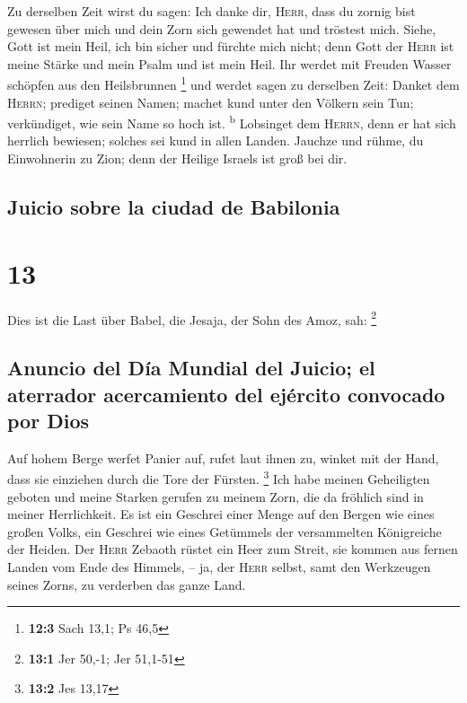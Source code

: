  Zu derselben Zeit wirst du sagen: Ich danke dir,
\textsc{Herr}, dass du zornig bist gewesen über mich und dein Zorn sich
gewendet hat und tröstest mich.  Siehe, Gott ist mein
Heil, ich bin sicher und fürchte mich nicht; denn Gott der \textsc{Herr}
ist meine Stärke und mein Psalm und ist mein Heil.  Ihr
werdet mit Freuden Wasser schöpfen aus den Heilsbrunnen \footnote{\textbf{12:3}
  Sach 13,1; Ps 46,5}  und werdet sagen zu derselben Zeit:
Danket dem \textsc{Herrn}; prediget seinen Namen; machet kund unter den
Völkern sein Tun; verkündiget, wie sein Name so hoch ist.
\textsuperscript{b}  Lobsinget dem \textsc{Herrn}, denn er
hat sich herrlich bewiesen; solches sei kund in allen Landen.
 Jauchze und rühme, du Einwohnerin zu Zion; denn der
Heilige Israels ist groß bei dir.

\hypertarget{juicio-sobre-la-ciudad-de-babilonia}{%
\subsection{Juicio sobre la ciudad de
Babilonia}\label{juicio-sobre-la-ciudad-de-babilonia}}

\hypertarget{section-12}{%
\section{13}\label{section-12}}

 Dies ist die Last über Babel, die Jesaja, der Sohn des
Amoz, sah: \footnote{\textbf{13:1} Jer 50,-1; Jer 51,1-51}

\hypertarget{anuncio-del-duxeda-mundial-del-juicio-el-aterrador-acercamiento-del-ejuxe9rcito-convocado-por-dios}{%
\subsection{Anuncio del Día Mundial del Juicio; el aterrador
acercamiento del ejército convocado por
Dios}\label{anuncio-del-duxeda-mundial-del-juicio-el-aterrador-acercamiento-del-ejuxe9rcito-convocado-por-dios}}

 Auf hohem Berge werfet Panier auf, rufet laut ihnen zu,
winket mit der Hand, dass sie einziehen durch die Tore der Fürsten.
\footnote{\textbf{13:2} Jes 13,17}  Ich habe meinen
Geheiligten geboten und meine Starken gerufen zu meinem Zorn, die da
fröhlich sind in meiner Herrlichkeit.  Es ist ein Geschrei
einer Menge auf den Bergen wie eines großen Volks, ein Geschrei wie
eines Getümmels der versammelten Königreiche der Heiden. Der
\textsc{Herr} Zebaoth rüstet ein Heer zum Streit,  sie
kommen aus fernen Landen vom Ende des Himmels, -- ja, der \textsc{Herr}
selbst, samt den Werkzeugen seines Zorns, zu verderben das ganze Land.

